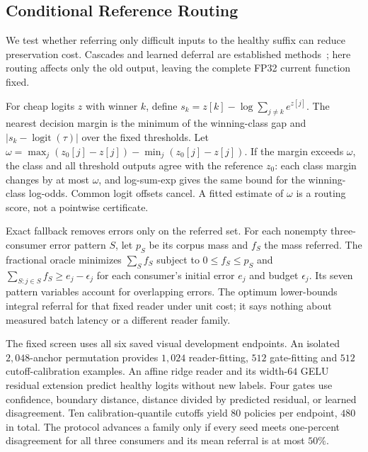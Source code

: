 \subsection{Conditional Reference Routing}\label{app:conditional_reference}

We test whether referring only difficult inputs to the healthy suffix can
reduce preservation cost. Cascades and learned deferral are established
methods~\citep{jitkrittum2023cascade}; here routing affects only the old output,
leaving the complete FP32 current function fixed.

For cheap logits $z$ with winner $k$, define $s_k=z[k]-\log\sum_{j\ne k}e^{z[j]}$.
The nearest decision margin is the minimum of the winning-class gap and
$|s_k-\operatorname{logit}(\tau)|$ over the fixed thresholds. Let
$\omega=\max_j(z_0[j]-z[j])-\min_j(z_0[j]-z[j])$. If the margin exceeds
$\omega$, the class and all threshold outputs agree with the reference $z_0$:
each class margin changes by at most $\omega$, and log-sum-exp gives the same
bound for the winning-class log-odds. Common logit offsets cancel. A fitted
estimate of $\omega$ is a routing score, not a pointwise certificate.

Exact fallback removes errors only on the referred set. For each nonempty
three-consumer error pattern $S$, let $p_S$ be its corpus mass and $f_S$ the
mass referred. The fractional oracle minimizes $\sum_Sf_S$ subject to
$0\le f_S\le p_S$ and $\sum_{S:j\in S}f_S\ge e_j-\epsilon_j$ for each
consumer's initial error $e_j$ and budget $\epsilon_j$. Its seven pattern
variables account for overlapping errors. The optimum lower-bounds integral
referral for that fixed reader under unit cost; it says nothing about measured
batch latency or a different reader family.

The fixed screen uses all six saved visual development endpoints. An isolated
$2{,}048$-anchor permutation provides $1{,}024$ reader-fitting, $512$ gate-fitting
and $512$ cutoff-calibration examples. An affine ridge reader and its width-$64$
GELU residual extension predict healthy logits without new labels. Four gates
use confidence, boundary distance, distance divided by predicted residual,
or learned disagreement. Ten calibration-quantile cutoffs yield $80$ policies
per endpoint, $480$ in total. The protocol advances a family only if every
seed meets one-percent disagreement for all three consumers and its mean
referral is at most $50\%$.



